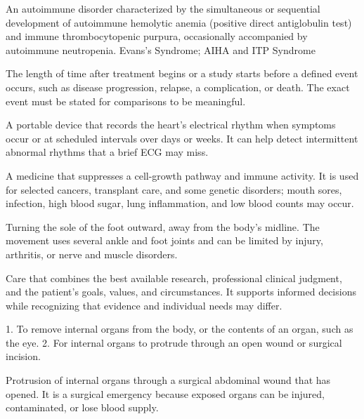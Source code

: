  An autoimmune disorder characterized by the simultaneous or sequential development of autoimmune hemolytic anemia (positive direct antiglobulin test) and immune thrombocytopenic purpura, occasionally accompanied by autoimmune neutropenia.
\synonyms
Evans's Syndrome; AIHA and ITP Syndrome

 The length of time after treatment begins or a study starts before a defined event occurs, such as disease progression, relapse, a complication, or death. The exact event must be stated for comparisons to be meaningful.

 A portable device that records the heart’s electrical rhythm when symptoms occur or at scheduled intervals over days or weeks. It can help detect intermittent abnormal rhythms that a brief ECG may miss.

 A medicine that suppresses a cell-growth pathway and immune activity. It is used for selected cancers, transplant care, and some genetic disorders; mouth sores, infection, high blood sugar, lung inflammation, and low blood counts may occur.

 Turning the sole of the foot outward, away from the body’s midline. The movement uses several ankle and foot joints and can be limited by injury, arthritis, or nerve and muscle disorders.

 Care that combines the best available research, professional clinical judgment, and the patient’s goals, values, and circumstances. It supports informed decisions while recognizing that evidence and individual needs may differ.

 1. To remove internal organs from the body, or the contents of an organ, such as the eye. 2. For internal organs to protrude through an open wound or surgical incision.

 Protrusion of internal organs through a surgical abdominal wound that has opened. It is a surgical emergency because exposed organs can be injured, contaminated, or lose blood supply.

